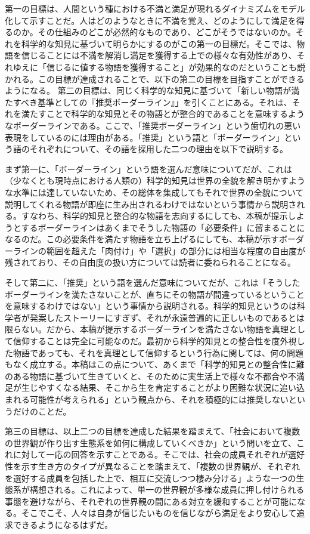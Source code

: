 \documentclass[8pt, a5paper]{ltjsarticle}
\begin{document}
第一の目標は、人間という種における不満と満足が現れるダイナミズムをモデル化して示すことだ。人はどのようなときに不満を覚え、どのようにして満足を得るのか。その仕組みのどこが必然的なものであり、どこがそうではないのか。それを科学的な知見に基づいて明らかにするのがこの第一の目標だ。そこでは、物語を信じることには不満を解消し満足を獲得する上での様々な有効性があり、それゆえに「信じるに値する物語を獲得すること」が効果的なのだということも説かれる。この目標が達成されることで、以下の第二の目標を目指すことができるようになる。
第二の目標は、同じく科学的な知見に基づいて「新しい物語が満たすべき基準としての『推奨ボーダーライン』」を引くことにある。それは、それを満たすことで科学的な知見とその物語とが整合的であることを意味するようなボーダーラインである。ここで、「推奨ボーダーライン」という歯切れの悪い表現をしているのには理由がある。「推奨」という語と「ボーダーライン」という語のそれぞれについて、その語を採用した二つの理由を以下で説明する。

まず第一に、「ボーダーライン」という語を選んだ意味についてだが、これは（少なくとも現時点における人類の）科学的知見は世界の全貌を解き明かすような水準には達していないため、その総体を集成してもそれで世界の全貌について説明してくれる物語が即座に生み出されるわけではないという事情から説明される。すなわち、科学的知見と整合的な物語を志向するにしても、本稿が提示しようとするボーダーラインはあくまでそうした物語の「必要条件」に留まることになるのだ。この必要条件を満たす物語を立ち上げるにしても、本稿が示すボーダーラインの範囲を超えた「肉付け」や「選択」の部分には相当な程度の自由度が残されており、その自由度の扱い方については読者に委ねられることになる。

そして第二に、「推奨」という語を選んだ意味についてだが、これは「そうしたボーダーラインを満たさないことが、直ちにその物語が間違っているということを意味するわけではない」という事情から説明される。科学的知見というのは科学者が発案したストーリーにすぎず、それが永遠普遍的に正しいものであるとは限らない。だから、本稿が提示するボーダーラインを満たさない物語を真理として信仰することは完全に可能なのだ。最初から科学的知見との整合性を度外視した物語であっても、それを真理として信仰するという行為に関しては、何の問題もなく成立する。本稿はこの点について、あくまで「科学的知見との整合性に難のある物語に基づいて生きていくと、そのために実生活上で様々な不都合や不満足が生じやすくなる結果、そこから生を肯定することがより困難な状況に追い込まれる可能性が考えられる」という観点から、それを積極的には推奨しないというだけのことだ。

第三の目標は、以上二つの目標を達成した結果を踏まえて、「社会において複数の世界観が作り出す生態系を如何に構成していくべきか」という問いを立て、これに対して一応の回答を示すことである。そこでは、社会の成員それぞれが選好性を示す生き方のタイプが異なることを踏まえて、「複数の世界観が、それぞれを選好する成員を包括した上で、相互に交流しつつ棲み分ける」ような一つの生態系が構想される。これによって、単一の世界観が多様な成員に押し付けられる事態を避けながら、それぞれの世界観の間にある対立を緩和することが可能になる。そこでこそ、人々は自身が信じたいものを信じながら満足をより安心して追求できるようになるはずだ。
\end{document}
